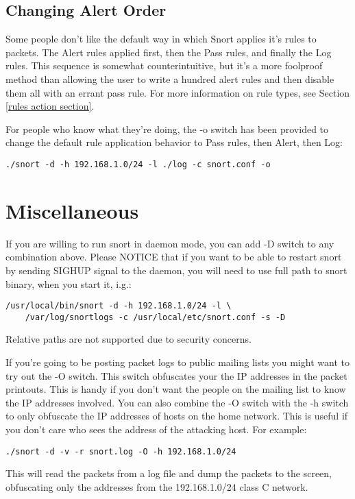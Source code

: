 \documentclass[english]{report}
\begin{document}
\subsection{Changing Alert Order}

Some people don't like the default way in which Snort applies it's
rules to packets. The Alert rules applied first, then the Pass rules,
and finally the Log rules. This sequence is somewhat counterintuitive,
but it's a more foolproof method than allowing the user to write a
hundred alert rules and then disable them all with an errant pass
rule. For more information on rule types, see Section \ref{rules action section}.

For people who know what they're doing, the -o
switch has been provided to change the default rule application behavior
to Pass rules, then Alert, then Log:

\begin{verbatim}
./snort -d -h 192.168.1.0/24 -l ./log -c snort.conf -o
\end{verbatim}

\section{Miscellaneous}

If you are willing to run snort in daemon mode,
you can add -D switch to any combination above. Please NOTICE that
if you want to be able to restart snort by sending SIGHUP signal to
the daemon, you will need to use full path to snort binary, when you
start it, i.g.:

\begin{verbatim}
/usr/local/bin/snort -d -h 192.168.1.0/24 -l \
    /var/log/snortlogs -c /usr/local/etc/snort.conf -s -D
\end{verbatim}
Relative paths are not supported due to security concerns.

If you're going to be posting packet logs to public mailing lists
you might want to try out the -O switch. This switch obfuscates
your the IP addresses in the packet printouts. This is handy if you
don't want the people on the mailing list to know the IP addresses
involved. You can also combine the -O switch with the -h switch to
only obfuscate the IP addresses of hosts on the home network. This
is useful if you don't care who sees the address of the attacking
host. For example:

\begin{verbatim}
./snort -d -v -r snort.log -O -h 192.168.1.0/24
\end{verbatim}
This will read the packets from a log file and dump the packets to
the screen, obfuscating only the addresses from the 192.168.1.0/24
class C network.
\end{document}
